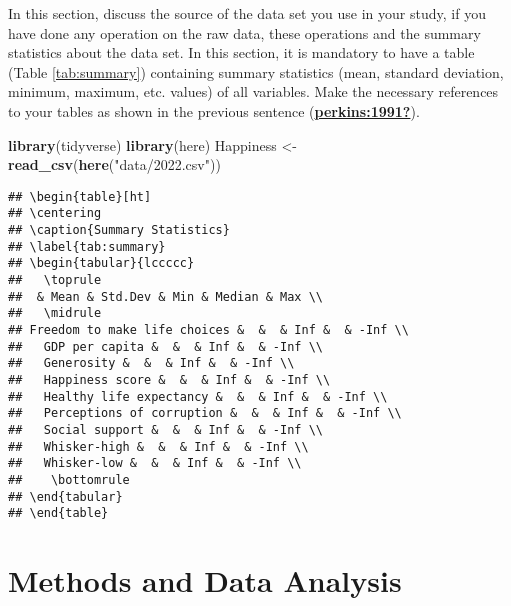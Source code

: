 \documentclass[
  12pt,
]{article}
\newenvironment{Shaded}{\begin{snugshade}}{\end{snugshade}}
\newcommand{\FunctionTok}[1]{\textcolor[rgb]{0.13,0.29,0.53}{\textbf{#1}}}
\newcommand{\NormalTok}[1]{#1}
\newcommand{\OtherTok}[1]{\textcolor[rgb]{0.56,0.35,0.01}{#1}}
\newcommand{\StringTok}[1]{\textcolor[rgb]{0.31,0.60,0.02}{#1}}
\begin{document}
In this section, discuss the source of the data set you use in your study, if you have done any operation on the raw data, these operations and the summary statistics about the data set. In this section, it is mandatory to have a table (Table \ref{tab:summary}) containing summary statistics (mean, standard deviation, minimum, maximum, etc. values) of all variables. Make the necessary references to your tables as shown in the previous sentence (\protect\hyperlink{ref-perkins:1991}{\textbf{perkins:1991?}}).

\begin{Shaded}
\begin{Highlighting}[]
\FunctionTok{library}\NormalTok{(tidyverse)}
\FunctionTok{library}\NormalTok{(here)}
\NormalTok{Happiness }\OtherTok{\textless{}{-}} \FunctionTok{read\_csv}\NormalTok{(}\FunctionTok{here}\NormalTok{(}\StringTok{"data/2022.csv"}\NormalTok{))}
\end{Highlighting}
\end{Shaded}

\begin{verbatim}
## \begin{table}[ht]
## \centering
## \caption{Summary Statistics} 
## \label{tab:summary}
## \begin{tabular}{lccccc}
##   \toprule
##  & Mean & Std.Dev & Min & Median & Max \\ 
##   \midrule
## Freedom to make life choices &  &  & Inf &  & -Inf \\ 
##   GDP per capita &  &  & Inf &  & -Inf \\ 
##   Generosity &  &  & Inf &  & -Inf \\ 
##   Happiness score &  &  & Inf &  & -Inf \\ 
##   Healthy life expectancy &  &  & Inf &  & -Inf \\ 
##   Perceptions of corruption &  &  & Inf &  & -Inf \\ 
##   Social support &  &  & Inf &  & -Inf \\ 
##   Whisker-high &  &  & Inf &  & -Inf \\ 
##   Whisker-low &  &  & Inf &  & -Inf \\ 
##    \bottomrule
## \end{tabular}
## \end{table}
\end{verbatim}

\hypertarget{methods-and-data-analysis}{%
\section{Methods and Data Analysis}\label{methods-and-data-analysis}}
\end{document}
